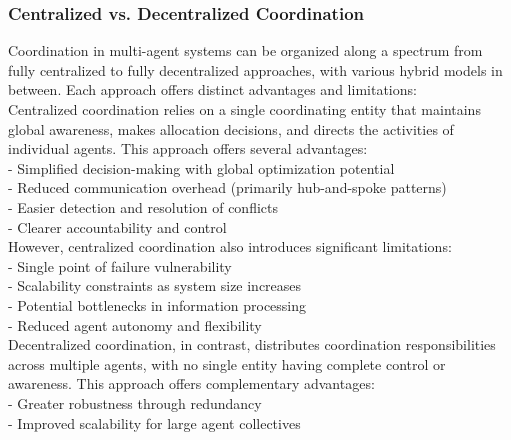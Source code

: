 \subsubsection{Centralized vs. Decentralized Coordination}
Coordination in multi-agent systems can be organized along a spectrum from fully centralized to fully decentralized approaches, with various hybrid models in between. Each approach offers distinct advantages and limitations:\\ \newline
Centralized coordination relies on a single coordinating entity that maintains global awareness, makes allocation decisions, and directs the activities of individual agents. This approach offers several advantages:\\ \newline
- Simplified decision-making with global optimization potential\\ \newline
- Reduced communication overhead (primarily hub-and-spoke patterns)\\ \newline
- Easier detection and resolution of conflicts\\ \newline
- Clearer accountability and control\\ \newline
However, centralized coordination also introduces significant limitations:\\ \newline
- Single point of failure vulnerability\\ \newline
- Scalability constraints as system size increases\\ \newline
- Potential bottlenecks in information processing\\ \newline
- Reduced agent autonomy and flexibility\\ \newline
Decentralized coordination, in contrast, distributes coordination responsibilities across multiple agents, with no single entity having complete control or awareness. This approach offers complementary advantages:\\ \newline
- Greater robustness through redundancy\\ \newline
- Improved scalability for large agent collectives\\ \newline
